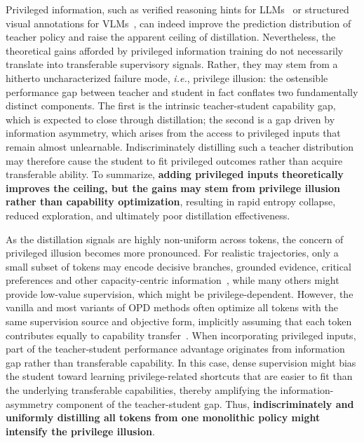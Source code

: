 \documentclass{llmxive}
\begin{document}
Privileged information, such as verified reasoning hints for LLMs~\citep{penaloza2026privileged,zhao2026self,hubotter2026reinforcement,yang2026self} or structured visual annotations for VLMs~\citep{yuan2026vision,liu2026visual}, can indeed improve the prediction distribution of teacher policy and raise the apparent ceiling of distillation. 
Nevertheless, the theoretical gains afforded by privileged information training do not necessarily translate into transferable supervisory signals. Rather, they may stem from a hitherto uncharacterized failure mode, \textit{i.e.}, privilege illusion: the ostensible performance gap between teacher and student in fact conflates two fundamentally distinct components. The first is the intrinsic teacher-student capability gap, which is expected to close through distillation; the second is a gap driven by information asymmetry, which arises from the access to privileged inputs that remain almost unlearnable.
Indiscriminately distilling such a teacher distribution may therefore cause the student to fit privileged outcomes rather than acquire transferable ability. 
To summarize, \textbf{adding privileged inputs theoretically improves the ceiling, but the gains may stem from privilege illusion rather than capability optimization}, resulting in rapid entropy collapse, reduced exploration, and ultimately poor distillation effectiveness.



As the distillation signals are highly non-uniform across tokens, the concern of privileged illusion becomes more pronounced.
For realistic trajectories, only a small subset of tokens may encode decisive branches, grounded evidence, critical preferences and other capacity-centric information~\citep{xu2026tip,jin2026entropy}, while many others might provide low-value supervision, which might be privilege-dependent.
However, the vanilla and most variants of OPD methods often optimize all tokens with the same supervision source and objective form, implicitly assuming that each token contributes equally to capability transfer~\citep{thinking2025opd,li2026rethinking,song2026survey}. When incorporating privileged inputs, part of the teacher-student performance advantage originates from information gap rather than transferable capability. In this case, dense supervision might bias the student toward learning privilege-related shortcuts that are easier to fit than the underlying transferable capabilities, thereby amplifying the information-asymmetry component of the teacher-student gap.
Thus, \textbf{indiscriminately and uniformly distilling all tokens from one monolithic policy might intensify the privilege illusion}.
\end{document}
